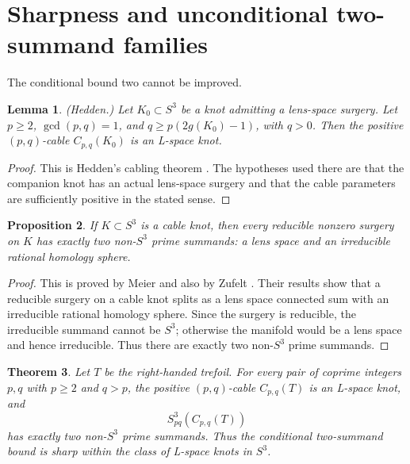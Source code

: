 \documentclass[12pt]{article}
\newtheorem{theorem}{Theorem}[section]
\newtheorem{proposition}[theorem]{Proposition}
\newtheorem{lemma}[theorem]{Lemma}
\theoremstyle{definition}
\begin{document}
\section{Sharpness and unconditional two-summand families}
\label{sec:sharpness}

The conditional bound two cannot be improved.

\begin{lemma}\label{lem:hedden-cabling}
(Hedden.)  Let \(K_0\subset S^3\) be a knot admitting a lens-space surgery.  Let \(p\ge 2\), \(\gcd(p,q)=1\), and \(q\ge p(2g(K_0)-1)\), with \(q>0\).  Then the positive \((p,q)\)-cable \(C_{p,q}(K_0)\) is an L-space knot.
\end{lemma}

\begin{proof}
This is Hedden's cabling theorem \cite[Theorem 1.10]{Hedden}.  The hypotheses used there are that the companion knot has an actual lens-space surgery and that the cable parameters are sufficiently positive in the stated sense.
\end{proof}

\begin{proposition}\label{prop:cable-unconditional}
If \(K\subset S^3\) is a cable knot, then every reducible nonzero surgery on \(K\) has exactly two non-\(S^3\) prime summands: a lens space and an irreducible rational homology sphere.
\end{proposition}

\begin{proof}
This is proved by Meier \cite{Meier} and also by Zufelt \cite{Zufelt}.  Their results show that a reducible surgery on a cable knot splits as a lens space connected sum with an irreducible rational homology sphere.  Since the surgery is reducible, the irreducible summand cannot be \(S^3\); otherwise the manifold would be a lens space and hence irreducible.  Thus there are exactly two non-\(S^3\) prime summands.
\end{proof}

\begin{theorem}\label{thm:sharp-two}
Let \(T\) be the right-handed trefoil.  For every pair of coprime integers \(p,q\) with \(p\ge 2\) and \(q>p\), the positive \((p,q)\)-cable \(C_{p,q}(T)\) is an L-space knot, and
\[
S^3_{pq}(C_{p,q}(T))
\]
has exactly two non-\(S^3\) prime summands.  Thus the conditional two-summand bound is sharp within the class of L-space knots in \(S^3\).
\end{theorem}
\end{document}
